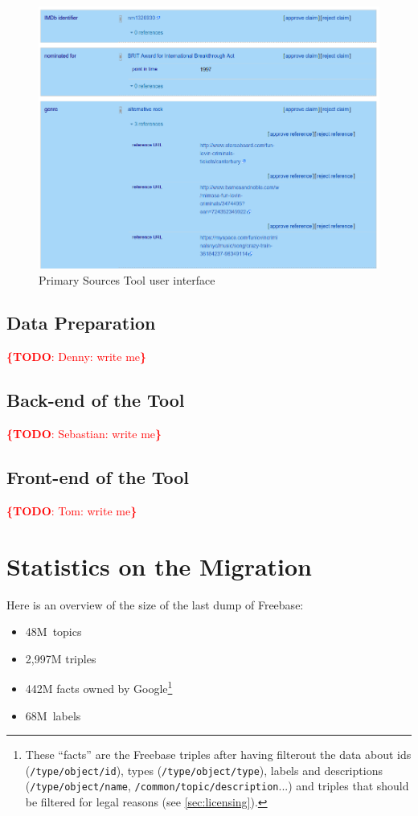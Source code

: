 \documentclass{sig-alternate}
\newcommand{\todo}[1]{\noindent\textcolor{red}{{\bf \{TODO}: #1{\bf \}}}}
\begin{document}
\begin{figure}[!htbp]
\centering
\includegraphics[width=8.45 cm]{img/primary-sources.png}
\caption{Primary Sources Tool user interface}
\label{fig:primary-sources-tool}
\end{figure}

\subsection{Data Preparation}

\todo{Denny: write me}

\subsection{Back-end of the Tool}

\todo{Sebastian: write me}

\subsection{Front-end of the Tool}

\todo{Tom: write me}

\section{Statistics on the Migration}\label{sec:statistics-of-the-migration}

Here is an overview of the size of the last dump of Freebase:

\begin{itemize}
  \setlength\itemsep{0em}
  \item 48M~topics
  \item 2,997M triples
  \item 442M facts owned by Google\footnote{These ``facts'' are the Freebase triples
      after having filterout the data about ids (\texttt{/type/object/id}),
      types (\texttt{/type/object/type}), labels and descriptions (\texttt{/type/object/name},
      \texttt{/common/topic/description}...) and triples that should be filtered
      for legal reasons (see \autoref{sec:licensing}).}
  \item 68M~labels
\end{itemize}
\end{document}
